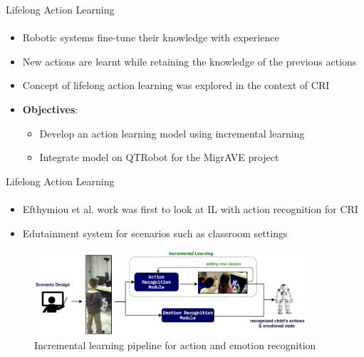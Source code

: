 \documentclass[aspectratio=169, xcolor=dvipsnames]{beamer}
\begin{document}
\begin{frame}{Lifelong Action Learning}
      \framesubtitle{}%
      
      \begin{itemize}
              \item Robotic systems fine-tune their knowledge with experience
              \item New actions are learnt while retaining the knowledge of the previous actions
              \item Concept of lifelong action learning was explored in the context of CRI
              \newline
              \item \textbf{Objectives}:
              \begin{itemize}
                  \item \small Develop an action learning model using incremental learning
                  \item \small Integrate model on QTRobot for the MigrAVE project
              \end{itemize}
      \end{itemize}
\end{frame}

\begin{frame}{Lifelong Action Learning}
      \framesubtitle{}%
      
      \begin{itemize}
              \item Efthymiou et al. work was first to look at IL with action recognition for CRI
              \item Edutainment system for scenarios such as classroom settings
      \end{itemize}
      
      \begin{figure}[h!]
              \centering
              \includegraphics[width=0.9\textwidth]{images/IL_pipeline.png} 
              \caption{Incremental learning pipeline for action and emotion recognition\footnotemark}
      \end{figure} 
\end{frame}
\end{document}

